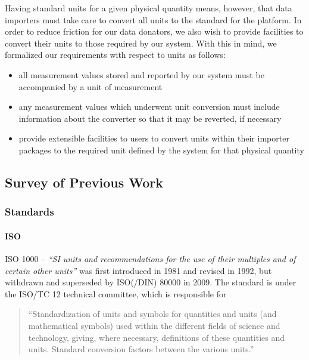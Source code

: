 Having standard units for a given physical quantity means, however, that
data importers must take care to convert all units to the standard for
the platform. In order to reduce friction for our data donators, we also
wish to provide facilities to convert their units to those required by
our system. With this in mind, we formalized our requirements with
respect to units as follows:

\begin{itemize}
\tightlist
\item
  all measurement values stored and reported by our system must be
  accompanied by a unit of measurement
\item
  any measurement values which underwent unit conversion must include
  information about the converter so that it may be reverted, if
  necessary
\item
  provide extensible facilities to users to convert units within their
  importer packages to the required unit defined by the system for that
  physical quantity
\end{itemize}

\subsection{Survey of Previous Work}\label{survey-of-previous-work}

\subsubsection{Standards}\label{standards}

\paragraph{ISO}\label{iso}

ISO 1000 -- \emph{``SI units and recommendations for the use of their
multiples and of certain other units''} was first introduced in 1981 and
revised in 1992, but withdrawn and superseded by ISO(/DIN) 80000 in
2009. The standard is under the ISO/TC 12 technical committee, which is
responsible for

\begin{quote}
``Standardization of units and symbols for quantities and units (and
mathematical symbols) used within the different fields of science and
technology, giving, where necessary, definitions of these quantities and
units. Standard conversion factors between the various units.''
\end{quote}

